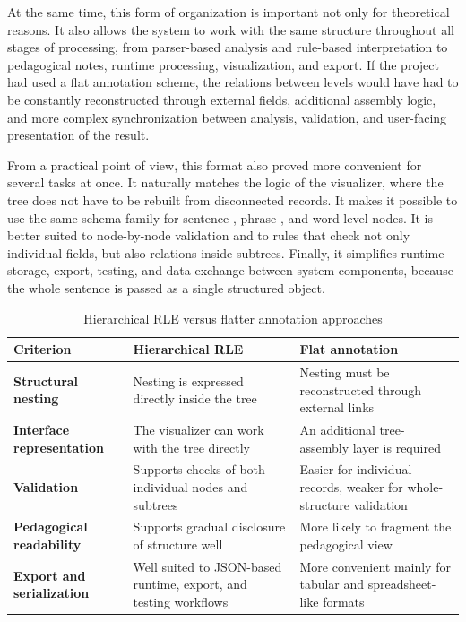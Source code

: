\documentclass[12pt,a4paper,oneside]{report}
\begin{document}
At the same time, this form of organization is important not only for theoretical reasons. It also allows the system to work with the same structure throughout all stages of processing, from parser-based analysis and rule-based interpretation to pedagogical notes, runtime processing, visualization, and export. If the project had used a flat annotation scheme, the relations between levels would have had to be constantly reconstructed through external fields, additional assembly logic, and more complex synchronization between analysis, validation, and user-facing presentation of the result.

From a practical point of view, this format also proved more convenient for several tasks at once. It naturally matches the logic of the visualizer, where the tree does not have to be rebuilt from disconnected records. It makes it possible to use the same schema family for sentence-, phrase-, and word-level nodes. It is better suited to node-by-node validation and to rules that check not only individual fields, but also relations inside subtrees. Finally, it simplifies runtime storage, export, testing, and data exchange between system components, because the whole sentence is passed as a single structured object.

\begin{table}[H]
  \centering
  \caption{Hierarchical RLE versus flatter annotation approaches}
  \begin{tabularx}{\textwidth}{>{\bfseries}p{3.5cm}X X}
    \toprule
    Criterion & Hierarchical RLE & Flat annotation \\
    \midrule
    Structural nesting & Nesting is expressed directly inside the tree & Nesting must be reconstructed through external links \\
    Interface representation & The visualizer can work with the tree directly & An additional tree-assembly layer is required \\
    Validation & Supports checks of both individual nodes and subtrees & Easier for individual records, weaker for whole-structure validation \\
    Pedagogical readability & Supports gradual disclosure of structure well & More likely to fragment the pedagogical view \\
    Export and serialization & Well suited to JSON-based runtime, export, and testing workflows & More convenient mainly for tabular and spreadsheet-like formats \\
    \bottomrule
  \end{tabularx}
\end{table}
\end{document}
